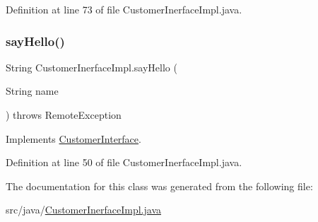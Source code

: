 Definition at line 73 of file Customer\+Inerface\+Impl.\+java.

\mbox{\label{class_customer_inerface_impl_abf7eca8202321d451365ad57abe6d6de}} 
\subsubsection{\texorpdfstring{sayHello()}{sayHello()}}
{\footnotesize\ttfamily String Customer\+Inerface\+Impl.\+say\+Hello (\begin{DoxyParamCaption}\item[{String}]{name }\end{DoxyParamCaption}) throws Remote\+Exception}



Implements \mbox{\hyperlink{interface_customer_interface_a9ab16776cf93e41a43e58f890189e3d1}{Customer\+Interface}}.



Definition at line 50 of file Customer\+Inerface\+Impl.\+java.



The documentation for this class was generated from the following file\+:\begin{DoxyCompactItemize}
\item 
src/java/\mbox{\hyperlink{_customer_inerface_impl_8java}{Customer\+Inerface\+Impl.\+java}}\end{DoxyCompactItemize}
